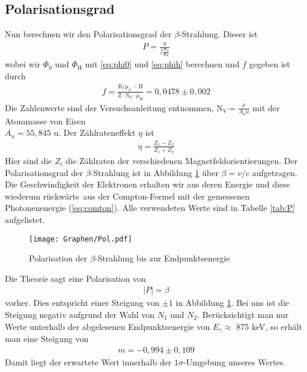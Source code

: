 \documentclass[twoside,colorback,accentcolor=tud4c,11pt]{tudreport}
\begin{document}
\subsection{Polarisationsgrad}\label{subsec:polgrad}
Nun berechnen wir den Polarisationsgrad der $ \beta $-Strahlung. Dieser ist 
\begin{align}
P=\frac{\eta}{f\frac{\Phi_0}{\Phi_\text{H}}}
\end{align}
wobei wir $ \Phi_0$ und $\Phi_\text{H} $ mit \ref{eq:phi0} und \ref{eq:phih} berechnen und $ f $ gegeben ist durch
\begin{align}
f=\frac{\text{B}/\mu_0-\text{H}}{\text{Z}\cdot\text{N}_V\cdot\mu_{\text{B}}}=0,0478\pm 0,002
\end{align}
Die Zahlenwerte sind der Versuchsanleitung entnommen, $ \text{N}_V=\frac{\rho}{A_uu} $ mit der Atommasse von Eisen \\ $ A_u=55,845 $ u. 
Der Zählrateneffekt $ \eta $ ist 
\begin{align}
\eta=\frac{Z_1-Z_2}{Z_1+Z_2}
\end{align}
Hier sind die $ Z_i $ die Zählraten der verschiedenen Magnetfeldorientierungen. Der Polarisationsgrad der $ \beta $-Strahlung ist in Abbildung \ref{fig:P} über $ \beta=v/c $ aufgetragen. Die Geschwindigkeit der Elektronen erhalten wir aus deren Energie und diese wiederum \glqq rückwärts\grqq\, aus der Compton-Formel mit der gemessenen Photonenenergie (\ref{eq:comton}). Alle verwendeten Werte sind in Tabelle \ref{tab:P} aufgelistet.
\begin{figure}[H]
\centering
   	\begin{minipage}[b]{1\textwidth}
   	\texttt{[image: Graphen/Pol.pdf]}
   	\caption{Polarisation der $ \beta $-Strahlung bis zur Endpunktsenergie}
  	\label{fig:P}
   	\end{minipage}
\end{figure}
Die Theorie sagt eine Polarisation von 
\begin{align}
|P|=\beta
\end{align}
vorher. Dies entspricht einer Steigung von $ \pm 1 $ in Abbildung \ref{fig:P}. Bei uns ist die Steigung negativ aufgrund der Wahl von $ N_1 $ und $ N_2 $. Berücksichtigt man nur Werte unterhalb der abgelesenen Endpunktsenergie von $ E_\gamma\approx $ 875 keV, so erhält man eine Steigung von 
\begin{align}
m=-0,994\pm 0,109
\end{align}
Damit liegt der erwartete Wert innerhalb der $ 1\sigma $-Umgebung unseres Wertes.
\end{document}
